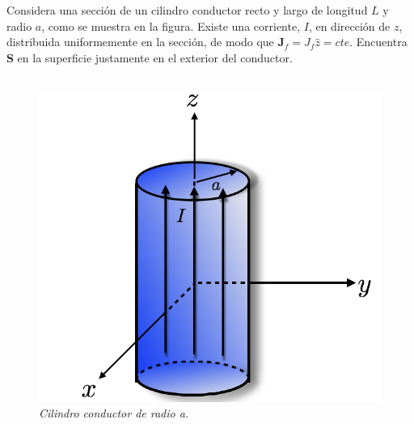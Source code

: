 \documentclass[11pt,fleqn]{book} %
\begin{document}
\newpage
\begin{example}
Considera una secci\'on de un cilindro conductor recto y largo de longitud $L$ y radio $a$, como se muestra en la figura. Existe una corriente, $I$, en direcci\'on de $z$, distribuida uniformemente en la secci\'on, de modo que $\textbf{J}_{f}=J_{f}\hat{z}=cte$. Encuentra $\textbf{S}$ en la superficie justamente en el exterior del conductor.\\\\
\begin{figure}[hbtp]
\centering
\includegraphics[scale=0.45]{Pictures/cilindrocorrientei.png}
\caption{\textit{Cilindro conductor de radio a.}}
\end{figure}


\end{example}
\end{document}
